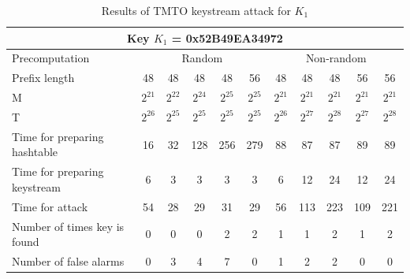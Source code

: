 \begin{table}[ht!]
\begin{center}
\begin{tabular}{|p{3cm}||c|c|c|c|c|c|c|c|c|c|}
\hline
\multicolumn{11}{|c|}{\textbf{Key $K_1$ = 0x52B49EA34972}} \\ \hline \hline
Precomputation 	& \multicolumn{5}{c|}{Random} & \multicolumn{5}{c|}{Non-random} \\ \hline
Prefix length										&	48 				&	48 				&	48 				&	48 				& 56 				&	48 				&	48				&	48 				&	56 				&	56  			\\ \hline
M																&	$2^{21}$ 	&	$2^{22}$ 	&	$2^{24}$ 	&	$2^{25}$ 	&	$2^{25}$ 	& $2^{21}$ 	&	$2^{21}$ 	&	$2^{21}$ 	&	$2^{21}$ 	& $2^{21}$	\\ \hline
T	  														&	$2^{26}$ 	&	$2^{25}$ 	&	$2^{25}$ 	&	$2^{25}$	&	$2^{25}$ 	& $2^{26}$ 	&	$2^{27}$ 	&	$2^{28}$ 	& $2^{27}$ 	& $2^{28}$	\\ \hline
Time for preparing hashtable		&	16 				&	32 				&	128				&	256				&	279 			& 88 				&	87				& 87				&	89	 			& 89				\\ \hline
Time for preparing keystream		&	6 				&	3 				&	3 				&	3 				&	3 				& 6 				&	12				& 24				&	12				& 24				\\ \hline
Time for attack									&	54 				&	28 				&	29 				&	31 				&	29 				& 56 				&	113				& 223				&	109				& 221				\\ \hline
Number of times key is found		&	0 				&	0 				&	0 				&	2 				&	2 				& 1 				&	1					& 2 				&	1 				& 2					\\ \hline
Number of false alarms					&	0 				&	3 				&	4 				&	7 				&	0 				& 1  				&	2					& 2 				& 0 				& 0					\\ \hline
\end{tabular}
\end{center}
\caption{Results of TMTO keystream attack for $K_1$}
\label{tab:keystream-attack-results-key1}
\end{table}


